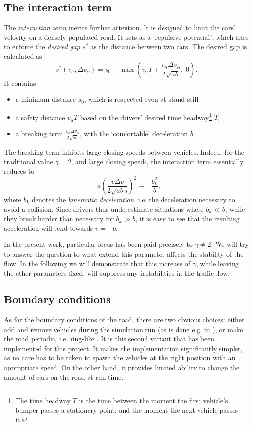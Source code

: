 \subsection{The interaction term}
The \emph{interaction term} merits further attention. It is designed to limit the cars' velocity on a densely populated road. It acts as a `repulsive potential', which tries to enforce the \emph{desired gap} $s^*$ as the distance between two cars. The desired gap is calculated as
\begin{equation}
s^*(v_\alpha, \Delta v_\alpha) = s_0 + \max\left(v_\alpha T + \frac{v_\alpha \Delta v_\alpha}{2\sqrt{ab}},\;0\right).
\label{eq:desired_gap}
\end{equation}
It contains
\begin{itemize}
    \item a minimum distance $s_0$, which is respected even at stand still,
    \item a safety distance $v_\alpha T$ based on the drivers' desired time headway\footnote{The time headway $T$ is the time between the moment the first vehicle's bumper passes a stationary point, and the moment the next vehicle passes it.} $T$,
    \item a breaking term $\frac{v_\alpha \Delta v_\alpha}{2\sqrt{ab}}$, with the `comfortable' deceleration $b$.
\end{itemize}
The breaking term inhibits large closing speeds between vehicles. Indeed, for the traditional value $\gamma=2$, and large closing speeds, the interaction term essentially reduces to 
\begin{equation}
    -a \left(\frac{v \Delta v}{2 \sqrt{a b}s}\right)^2 = -\frac{b_k^2}{b},
\end{equation}
where $b_k$ denotes the \emph{kinematic deceleration}, i.e. the deceleration necessary to avoid a collision. Since drivers thus underestimate situations where $b_k\ll b$, while they break harder than necessary for $b_k\gg b$, it is easy to see that the resulting acceleration will tend towards $\dot v = -b$. \cite{treiber2000}

In the present work, particular focus has been paid precisely to  $\gamma \ne 2$. We will try to answer the question to what extend this parameter affects the stability of the flow. In the following we will demonstrate that this increase of $\gamma$, while leaving the other parameters fixed, will suppress any instabilities in the traffic flow.

\subsection{Boundary conditions}
As for the boundary conditions of the road, there are two obvious choices: either add and remove vehicles during the simulation run (as is done e.g. in \cite{treiber1999}), or make the road periodic, i.e. ring-like \cite{treiber2015}. It is this second variant that has been implemented for this project. It makes the implementation significantly simpler, as no care has to be taken to spawn the vehicles at the right position with an appropriate speed. On the other hand, it provides limited ability to change the amount of cars on the road at run-time.

